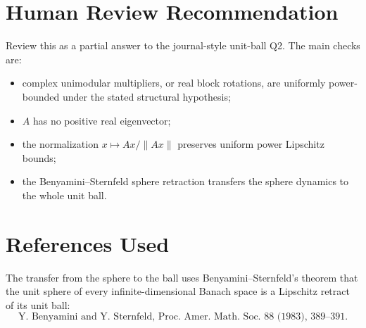 \documentclass[11pt]{article}
\begin{document}
\section*{Human Review Recommendation}

Review this as a partial answer to the journal-style unit-ball Q2.  The main
checks are:
\begin{itemize}
\item complex unimodular multipliers, or real block rotations, are uniformly
power-bounded under the stated structural hypothesis;
\item \(A\) has no positive real eigenvector;
\item the normalization \(x\mapsto Ax/\|Ax\|\) preserves uniform power
Lipschitz bounds;
\item the Benyamini--Sternfeld sphere retraction transfers the sphere
dynamics to the whole unit ball.
\end{itemize}

\section*{References Used}

The transfer from the sphere to the ball uses Benyamini--Sternfeld's theorem
that the unit sphere of every infinite-dimensional Banach space is a
Lipschitz retract of its unit ball:
\[
\text{Y. Benyamini and Y. Sternfeld, Proc. Amer. Math. Soc. 88 (1983),
389--391.}
\]
\end{document}
